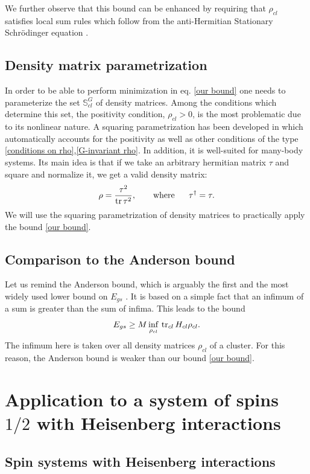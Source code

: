 \documentclass[a4paper]{jpconf}
\renewcommand\[{\begin{equation}}
\renewcommand\]{\end{equation}}
\newcommand{\be}{\begin{equation}}
\newcommand{\ee}{\end{equation}}
\begin{document}
We further observe that this bound can be enhanced by requiring that $\rho_{cl}$ satisfies local sum rules which follow from the anti-Hermitian Stationary Schr\"odinger equation \cite{Shpagina}.

\subsection{Density matrix parametrization}
In order to be able to perform minimization in eq. \eqref{our bound} one needs to parameterize the set ${\mathbb S}_{cl}^G$ of density matrices. 
Among the conditions which determine this set, the positivity condition, $\rho_{cl}>0$, is the most problematic due to its nonlinear nature. A squaring parametrization has been developed in \cite{SqParam} which automatically accounts for the positivity as well as other  conditions of the type \eqref{conditions on rho},\eqref{G-invariant rho}. In addition, it is well-suited for many-body systems. Its main idea is that if we take an arbitrary hermitian matrix $\tau$  and square and normalize it, we get a valid density matrix:
\[\rho  = \frac{{{\tau ^2}}}{{\mathop{\rm{tr}}{\tau ^2}}},~~~~~~{\rm where}~~~~~ {\tau ^ \dagger } = \tau. \label{tau}\]
We will use the squaring parametrization of density matrices to practically apply the bound \eqref{our bound}.



\subsection{Comparison to the Anderson bound}

Let us remind the Anderson bound, which is arguably the first and the most widely used lower bound on $E_{gs}$ \cite{Anderson}. It is based on a simple fact that an infimum of a sum is greater than the sum of infima. This leads to the bound
\be
E_{gs} \geq
M \inf\limits_{ \rho_{cl} } \, \tr_{cl}  H_{cl} \rho_{cl}.
\ee
The infimum here is taken over all density matrices $\rho_{cl}$ of a cluster. For this reason, the Anderson bound is weaker than our bound \eqref{our bound}.

\section{Application to a system of spins $1/2$ with Heisenberg interactions}

\subsection{Spin systems with Heisenberg interactions}
\end{document}
